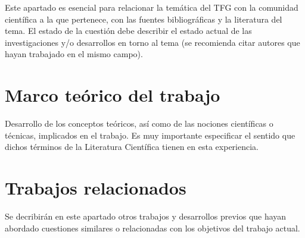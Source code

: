 Este apartado es esencial para relacionar la temática del TFG con la comunidad científica a la que pertenece, con las fuentes bibliográficas y la literatura del tema. El estado de la cuestión debe describir el estado actual de las investigaciones y/o desarrollos en torno al tema (se recomienda citar autores que hayan trabajado en el mismo campo).

\section{Marco teórico del trabajo}

Desarrollo de los conceptos teóricos, así como de las nociones científicas o técnicas, implicados en el trabajo. Es muy importante especificar el sentido que dichos términos de la Literatura Científica tienen en esta experiencia. 

\section{Trabajos relacionados}

Se decribirán en este apartado otros trabajos y desarrollos previos que hayan abordado cuestiones similares o relacionadas con los objetivos del trabajo actual.

